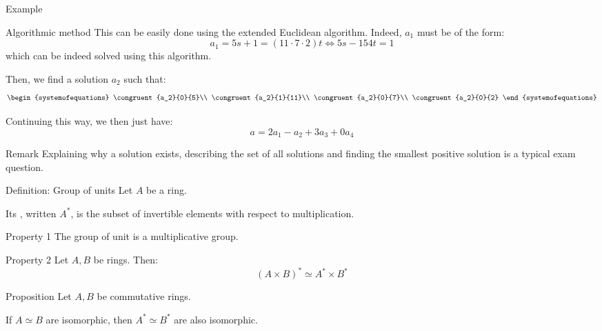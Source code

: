 \documentclass[a4paper]{article}
\begin{document}
\begin{parag}{Example}
\begin{subparag}{Algorithmic method}
        This can be easily done using the extended Euclidean algorithm. Indeed, $a_1$ must be of the form: 
        \[a_1 = 5s + 1 = \left(11\cdot 7\cdot 2\right)t \iff 5s - 154t = 1\]
        which can be indeed solved using this algorithm.
        
        Then, we find a solution $a_2$ such that:
        \[\begin{systemofequations} \congruent{a_2}{0}{5}\\ \congruent{a_2}{1}{11}\\ \congruent{a_2}{0}{7}\\ \congruent{a_2}{0}{2} \end{systemofequations}\]

        Continuing this way, we then just have: 
        \[a = 2 a_1 - a_2 + 3a_3 + 0a_4\]
    \end{subparag}

    \begin{subparag}{Remark}
        Explaining why a solution exists, describing the set of all solutions and finding the smallest positive solution is a typical exam question.
    \end{subparag}
\end{parag}

\begin{parag}{Definition: Group of units}
    Let $A$ be a ring. 

    Its , written $A^*$, is the subset of invertible elements with respect to multiplication.

    \begin{subparag}{Property 1}
        The group of unit is a multiplicative group.
    \end{subparag}

    \begin{subparag}{Property 2}
        Let $A, B$ be rings. Then: 
        \[\left(A \times B\right)^* \simeq A^* \times B^*\]
    \end{subparag}
\end{parag}

\begin{parag}{Proposition}
    Let $A, B$ be commutative rings.

    If $A \simeq B$ are isomorphic, then $A^* \simeq B^*$ are also isomorphic.
\end{parag}
\end{document}
